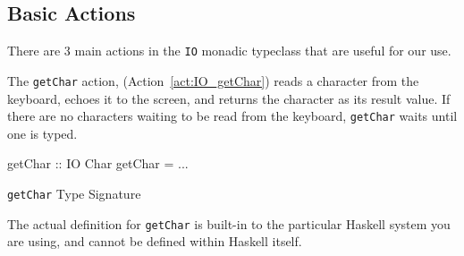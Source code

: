 \subsection{Basic \texorpdfstring{}{\texttt{IO}} Actions}\label{subsec:Basic_IO_Actions}
There are 3 main actions in the \texttt{IO} monadic typeclass that are useful for our use.
\begin{nocrefenumerate}
\item {}\label{act:IO_getChar}
\item {}\label{act:IO_putChar}
\item {}\label{act:IO_return}
\end{nocrefenumerate}

The \texttt{getChar} action, (Action~\ref{act:IO_getChar}) reads a character from the keyboard, echoes it to the screen, and returns the character as its result value.
If there are no characters waiting to be read from the keyboard, \texttt{getChar} waits until one is typed.
\begin{listing}[h!tbp]
\begin{haskellsource}
getChar :: IO Char
getChar = ...
\end{haskellsource}
\caption{\texttt{getChar} Type Signature}
\label{lst:IO_getChar_Type}
\end{listing}
The actual definition for \texttt{getChar} is built-in to the particular Haskell system you are using, and cannot be defined within Haskell itself.


